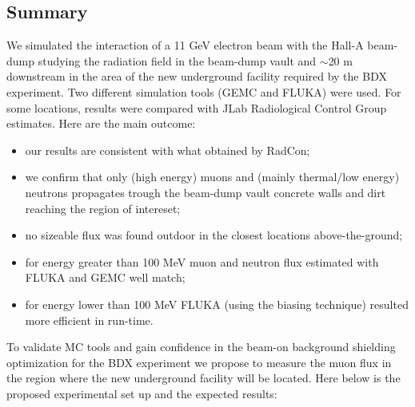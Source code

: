 \subsection{Summary}
We simulated the interaction of a 11 GeV electron beam with the Hall-A beam-dump studying the   radiation field in the beam-dump vault and   $\sim$20 m downstream
 in the area of  the new underground  facility required by the BDX experiment. Two different  simulation tools (GEMC and FLUKA) were used. For some locations, results were compared with JLab Radiological Control Group estimates. 
Here are the main outcome:
\begin{itemize}
\item{our results are consistent with what obtained by RadCon;}
\item{we confirm that only (high energy) muons and (mainly  thermal/low energy) neutrons propagates trough the beam-dump vault concrete walls  and dirt reaching the region of intereset; }
\item{no sizeable flux was found outdoor in the closest locations above-the-ground;}
\item{for energy greater than 100 MeV muon and neutron flux estimated with FLUKA and GEMC well match;}
\item{for energy lower than 100 MeV  FLUKA (using the biasing technique)  resulted more efficient in run-time. }
\end{itemize}
To validate MC tools and gain confidence in the beam-on background shielding optimization  for the  BDX experiment we propose to measure the muon flux in the region where the new underground facility will be located. 
Here below is the proposed experimental set up and the expected results:
